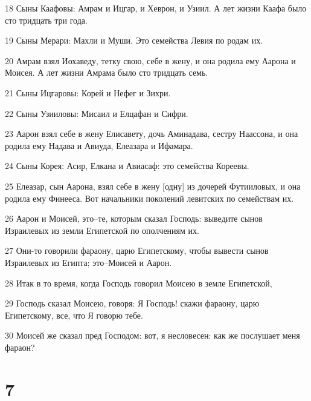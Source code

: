 \par 18 Сыны Каафовы: Амрам и Ицгар, и Хеврон, и Узиил. А лет жизни Каафа было сто тридцать три года.
\par 19 Сыны Мерари: Махли и Муши. Это семейства Левия по родам их.
\par 20 Амрам взял Иохаведу, тетку свою, себе в жену, и она родила ему Аарона и Моисея. А лет жизни Амрама было сто тридцать семь.
\par 21 Сыны Ицгаровы: Корей и Нефег и Зихри.
\par 22 Сыны Узииловы: Мисаил и Елцафан и Сифри.
\par 23 Аарон взял себе в жену Елисавету, дочь Аминадава, сестру Наассона, и она родила ему Надава и Авиуда, Елеазара и Ифамара.
\par 24 Сыны Корея: Асир, Елкана и Авиасаф: это семейства Кореевы.
\par 25 Елеазар, сын Аарона, взял себе в жену [одну] из дочерей Футииловых, и она родила ему Финееса. Вот начальники поколений левитских по семействам их.
\par 26 Аарон и Моисей, это--те, которым сказал Господь: выведите сынов Израилевых из земли Египетской по ополчениям их.
\par 27 Они-то говорили фараону, царю Египетскому, чтобы вывести сынов Израилевых из Египта; это--Моисей и Аарон.
\par 28 Итак в то время, когда Господь говорил Моисею в земле Египетской,
\par 29 Господь сказал Моисею, говоря: Я Господь! скажи фараону, царю Египетскому, все, что Я говорю тебе.
\par 30 Моисей же сказал пред Господом: вот, я несловесен: как же послушает меня фараон?

\chapter{7}

